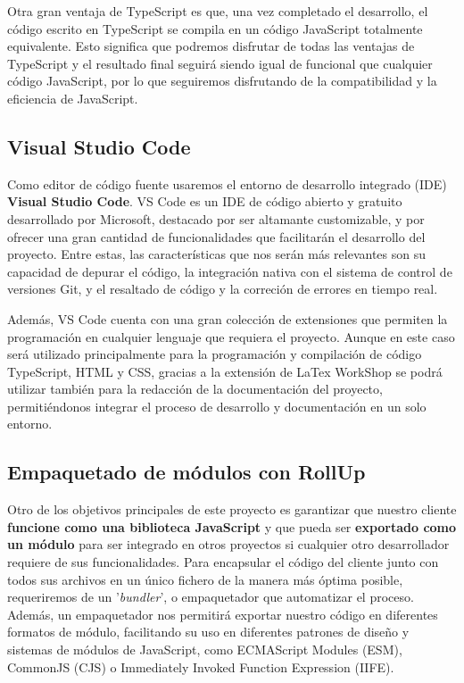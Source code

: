 Otra gran ventaja de TypeScript es que, una vez completado el desarrollo, el código escrito en TypeScript se compila en un código JavaScript totalmente equivalente. Esto significa que podremos disfrutar de todas las ventajas de TypeScript y el resultado final seguirá siendo igual de funcional que cualquier código JavaScript, por lo que seguiremos disfrutando de la compatibilidad y la eficiencia de JavaScript.

\subsection{Visual Studio Code}
 
Como editor de código fuente usaremos el entorno de desarrollo integrado (IDE)\textbf{ Visual Studio Code}. VS Code es un IDE de código abierto y gratuito desarrollado por Microsoft, destacado por ser altamante customizable, y por ofrecer una gran cantidad de funcionalidades que facilitarán el desarrollo del proyecto. Entre estas, las características que nos serán más relevantes son su capacidad de depurar el código, la integración nativa con el sistema de control de versiones Git, y el resaltado de código y la correción de errores en tiempo real.

Además, VS Code cuenta con una gran colección de extensiones que permiten la programación en cualquier lenguaje que requiera el proyecto. Aunque en este caso será utilizado principalmente para la programación y compilación de código TypeScript,  HTML y CSS, gracias a la extensión de LaTex WorkShop se podrá utilizar también para la redacción de la documentación del proyecto, permitiéndonos integrar el proceso de desarrollo y documentación en un solo entorno.

\subsection{Empaquetado de módulos con RollUp}
 
Otro de los objetivos principales de este proyecto es garantizar que nuestro cliente \textbf{funcione como una biblioteca JavaScript} y que pueda ser \textbf{exportado como un módulo} para ser integrado en otros proyectos si cualquier otro desarrollador requiere de sus funcionalidades. Para encapsular el código del cliente junto con todos sus archivos en un único fichero de la manera más óptima posible, requeriremos de un '\textit{bundler}', o empaquetador que automatizar el proceso. Además, un empaquetador nos permitirá exportar nuestro código en diferentes formatos de módulo, facilitando su uso en diferentes patrones de diseño y sistemas de módulos de JavaScript, como ECMAScript Modules (ESM), CommonJS (CJS) o Immediately Invoked Function Expression (IIFE).
 
